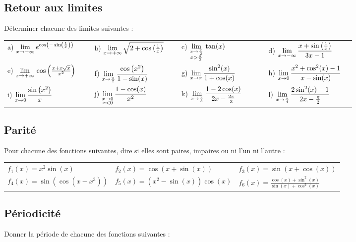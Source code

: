 \documentclass[oneside,12pt]{book}          %
\begin{document}
\subsection{Retour aux limites}
Déterminer chacune des limites suivantes :

\renewcommand{\arraystretch}{2.5}
\begin{tabular}{p{0.23\linewidth}p{0.23\linewidth}p{0.23\linewidth}p{0.23\linewidth}}
	a) ${\lim\limits_{x\to +\infty}}\, e^{\cos\left(-\sin\left(\frac{1}{x}\right)\right)}$ & b) ${\lim\limits_{x\to +\infty}}\,\sqrt{2+\cos\left(\frac{1}{x}\right)}$ & c) ${\lim\limits_{\substack{x\to\frac{\pi}{2}\\x>\frac{\pi}{2}}}}\,\tan(x)$ & d) ${\lim\limits_{\substack{x\to-\infty}}}\,\dfrac{x+\sin\left(\frac{1}{x}\right)}{3x-1}$\\
	e) ${\lim\limits_{x\to +\infty}}\,\cos\left(\frac{x+x\sqrt{x}}{x^2}\right)$ & f) ${\lim\limits_{\substack{x\to\frac{\pi}{2}}}}\,\dfrac{\cos\left(x^2\right)}{1-\sin(x)}$ & g) ${\lim\limits_{\substack{x\to\pi}}}\,\dfrac{\sin^2(x)}{1+\cos(x)}$ & h) ${\lim\limits_{\substack{x\to0}}}\, \dfrac{x^2+\cos^2(x)-1}{x-\sin(x)}$\\
	i) ${\lim\limits_{\substack{x\to0}}}\,\dfrac{\sin\left(x^2\right)}{x}$ & j) ${\lim\limits_{\substack{x\to0\\x<0}}}\,\dfrac{1-\cos(x)}{x^2}$ & k) ${\lim\limits_{\substack{x\to\frac{\pi}{3}}}}\,\dfrac{1-2\cos(x)}{2x-\frac{2\pi}{3}}$ & l) ${\lim\limits_{\substack{x\to\frac{\pi}{4}}}}\,\dfrac{2\sin^2(x)-1}{2x-\frac{\pi}{2}}$
\end{tabular}



\subsection{Parité}
Pour chacune des fonctions suivantes, dire si elles sont paires, impaires ou ni l'un ni l'autre :

\renewcommand{\arraystretch}{1.5}
\begin{tabular}{p{} p{} p{}}
     $f_1(x)=x^2\sin(x)$ & $f_2(x)=\cos(x+\sin(x))$ & $f_3(x)=\sin(x+\cos(x))$ \\
     $f_4(x)= \sin\left(\cos\left(x-x^3\right)\right)$ & $f_5(x)=(x^2-\sin(x))\cos(x)$ & $f_6(x)=\frac{\cos(x)+\sin^2(x)}{\sin(x)+\cos^2(x)}$ \\
     
\end{tabular}



\subsection{Périodicité}
Donner la période de chacune des fonctions suivantes :
\end{document}
